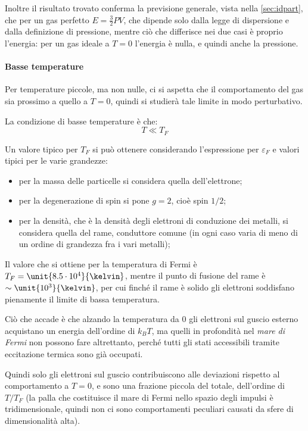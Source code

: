 Inoltre il risultato trovato conferma la previsione generale, vista nella \cref{sec:idpart}, che per un gas perfetto $ E = \frac{3}{2} PV$, che dipende solo dalla legge di dispersione e dalla definizione di pressione, mentre ciò che differisce nei due casi è proprio l'energia: per un gas ideale a $T=0$ l'energia è nulla, e quindi anche la pressione.

\paragraph{Basse temperature} Per temperature piccole, ma non nulle, ci si aspetta che il comportamento del gas sia prossimo a quello a $T=0$, quindi si studierà tale limite in modo perturbativo.

La condizione di basse temperature è che:
\begin{equation*}
T \ll T_F
\end{equation*}

Un valore tipico per $T_F$ si può ottenere considerando l'espressione per $\varepsilon_F$ e valori tipici per le varie grandezze:
\begin{itemize}
	\item per la massa delle particelle si considera quella dell'elettrone;
	\item per la degenerazione di spin si pone $g=2$, cioè spin $1/2$;
	\item per la densità, che è la densità degli elettroni di conduzione dei metalli, si considera quella del rame, conduttore comune (in ogni caso varia di meno di un ordine di grandezza fra i vari metalli);
\end{itemize}
Il valore che si ottiene per la temperatura di Fermi è $T_F = \unit{8.5\cdot10^4}{\kelvin}$, mentre il punto di fusione del rame è $\sim \unit{10^3}{\kelvin}$, per cui finché il rame è solido gli elettroni soddisfano pienamente il limite di bassa temperatura.
\newline

Ciò che accade è che alzando la temperatura da $0$ gli elettroni sul guscio esterno acquistano un energia dell'ordine di $k_B T$, ma quelli in profondità nel \textit{mare di Fermi} non possono fare altrettanto, perché tutti gli stati accessibili tramite eccitazione termica sono già occupati.

Quindi solo gli elettroni sul guscio contribuiscono alle deviazioni rispetto al comportamento a $T=0$, e sono una frazione piccola del totale, dell'ordine di $T/T_F$ (la palla che costituisce il mare di Fermi nello spazio degli impulsi è tridimensionale, quindi non ci sono comportamenti peculiari causati da sfere di dimensionalità alta).


